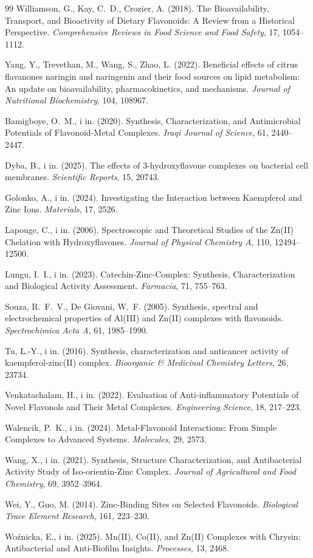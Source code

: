 \documentclass[12pt,a4paper]{article}
\begin{document}
\begin{thebibliography}{99}
Williamson, G., Kay, C.~D., Crozier, A. (2018). The Bioavailability, Transport, and Bioactivity of Dietary Flavonoids: A Review from a Historical Perspective. \textit{Comprehensive Reviews in Food Science and Food Safety}, 17, 1054--1112.

Yang, Y., Trevethan, M., Wang, S., Zhao, L. (2022). Beneficial effects of citrus flavanones naringin and naringenin and their food sources on lipid metabolism: An update on bioavailability, pharmacokinetics, and mechanisms. \textit{Journal of Nutritional Biochemistry}, 104, 108967.

Bamigboye, O.~M., i in. (2020). Synthesis, Characterization, and Antimicrobial Potentials of Flavonoid-Metal Complexes. \textit{Iraqi Journal of Science}, 61, 2440--2447.

Dyba, B., i in. (2025). The effects of 3-hydroxyflavone complexes on bacterial cell membranes. \textit{Scientific Reports}, 15, 20743.

Golonko, A., i in. (2024). Investigating the Interaction between Kaempferol and Zinc Ions. \textit{Materials}, 17, 2526.

Lapouge, C., i in. (2006). Spectroscopic and Theoretical Studies of the Zn(II) Chelation with Hydroxyflavones. \textit{Journal of Physical Chemistry A}, 110, 12494--12500.

Lungu, I.~I., i in. (2023). Catechin-Zinc-Complex: Synthesis, Characterization and Biological Activity Assessment. \textit{Farmacia}, 71, 755--763.

Souza, R.~F.~V., De Giovani, W.~F. (2005). Synthesis, spectral and electrochemical properties of Al(III) and Zn(II) complexes with flavonoids. \textit{Spectrochimica Acta A}, 61, 1985--1990.

Tu, L.-Y., i in. (2016). Synthesis, characterization and anticancer activity of kaempferol-zinc(II) complex. \textit{Bioorganic \& Medicinal Chemistry Letters}, 26, 23734.

Venkatachalam, H., i in. (2022). Evaluation of Anti-inflammatory Potentials of Novel Flavonols and Their Metal Complexes. \textit{Engineering Science}, 18, 217--223.

Walencik, P.~K., i in. (2024). Metal-Flavonoid Interactions: From Simple Complexes to Advanced Systems. \textit{Molecules}, 29, 2573.

Wang, X., i in. (2021). Synthesis, Structure Characterization, and Antibacterial Activity Study of Iso-orientin-Zinc Complex. \textit{Journal of Agricultural and Food Chemistry}, 69, 3952--3964.

Wei, Y., Guo, M. (2014). Zinc-Binding Sites on Selected Flavonoids. \textit{Biological Trace Element Research}, 161, 223--230.

Woźnicka, E., i in. (2025). Mn(II), Co(II), and Zn(II) Complexes with Chrysin: Antibacterial and Anti-Biofilm Insights. \textit{Processes}, 13, 2468.

\end{thebibliography}
\end{document}

